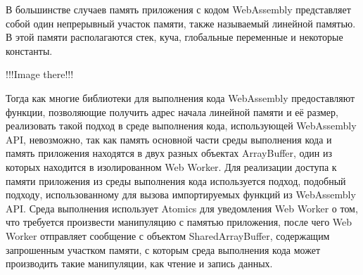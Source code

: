 В большинстве случаев память приложения с кодом WebAssembly представляет собой один непрерывный участок памяти, также называемый линейной памятью.
В этой памяти располагаются стек, куча, глобальные переменные и некоторые константы.

!!!Image there!!!



Тогда как многие библиотеки для выполнения кода WebAssembly предоставляют функции, позволяющие получить адрес начала линейной памяти и её размер, реализовать такой подход в среде выполнения кода, использующей WebAssembly API, невозможно, так как память основной части среды выполнения кода и память приложения находятся в двух разных объектах ArrayBuffer, один из которых находится в изолированном Web Worker. 
Для реализации доступа к памяти приложения из среды выполнения кода используется подход, подобный подходу, использованному для вызова импортируемых функций из WebAssembly API.
Среда выполнения использует Atomics для уведомления Web Worker о том, что требуется произвести манипуляцию с памятью приложения, после чего Web Worker отправляет сообщение с объектом SharedArrayBuffer, содержащим запрошенным участком памяти, с которым среда выполнения кода может производить такие манипуляции, как чтение и запись данных.

